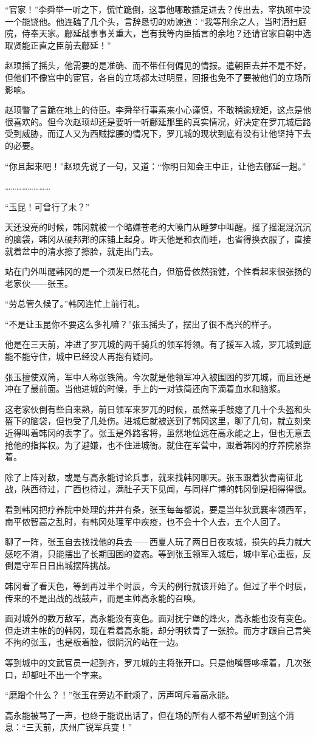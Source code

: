 “官家！”李舜举一听之下，慌忙跪倒，这事他哪敢插足进去？传出去，宰执班中没一个能饶他。他连磕了几个头，言辞恳切的劝谏道：“我等刑余之人，当时洒扫庭院，侍奉天家。鄜延战事事关重大，岂有我等内臣插言的余地？还请官家自朝中选取贤能正直之臣前去鄜延！”

赵顼摇了摇头，他需要的是准确、而不带任何偏见的情报。遣朝臣去并不是不好，但他们不像宫中的宦官，各自的立场都太过明显，回报也免不了要被他们的立场所影响。

赵顼瞥了言跪在地上的侍臣。李舜举行事素来小心谨慎，不敢稍逾规矩，这点是他很喜欢的。但今次赵顼却还是要听一听鄜延那里的真实情况，好决定在罗兀城后路受到威胁，而辽人又为西贼撑腰的情况下，罗兀城的现状到底有没有让他坚持下去的必要。

“你且起来吧！”赵顼先说了一句，又道：“你明日知会王中正，让他去鄜延一趟。”

……………………

“玉昆！可曾行了未？”

天还没亮的时候，韩冈就被一个略嫌苍老的大嗓门从睡梦中叫醒。摇了摇混混沉沉的脑袋，韩冈从硬邦邦的床铺上起身。昨天他是和衣而睡，也省得换衣服了，直接就着盆中的清水擦了擦脸，就走出门去。

站在门外叫醒韩冈的是一个须发已然花白，但筋骨依然强健，个性看起来很张扬的老家伙——张玉。

“劳总管久候了。”韩冈连忙上前行礼。

“不是让玉昆你不要这么多礼嘛？”张玉摇头了，摆出了很不高兴的样子。

他是在三天前，冲进了罗兀城的两千骑兵的领军将领。有了援军入城，罗兀城到底能不能守住，城中已经没人再抱有疑问。

张玉擅使双简，军中人称张铁简。今次就是他领军冲入被围困的罗兀城，而且还是冲在了最前面。当他进城的时候，手上的一对铁简还向下滴着血水和脑浆。

这老家伙倒有些自来熟，前日领军来罗兀的时候，虽然亲手敲瘪了几十个头盔和头盔下的脑袋，但也受了几处伤。进城后就被送到了韩冈这里，聊了几句，就立刻亲近得叫着韩冈的表字了。张玉是外路客将，虽然地位远在高永能之上，但也无意去抢他的指挥权。为了避嫌，也不住进城衙。就住在军营中，跟着韩冈的疗养院紧靠着。

除了上阵对敌，或是与高永能讨论兵事，就来找韩冈聊天。张玉跟着狄青南征北战，陕西待过，广西也待过，满肚子天下见闻，与同样广博的韩冈倒是相得得很。

看到韩冈把疗养院中处理的井井有条，张玉每每都说，要是当年狄武襄率领西军，南平侬智高之乱时，有韩冈处理军中疾疫，也不会十个人去，五个人回了。

聊了一阵，张玉自去找找他的兵去——西夏人玩了两日日夜攻城，损失的兵力就大感吃不消，只能摆出了长期围困的姿态。等到张玉领军入城后，城中军心重振，反倒是守军日日出城摆阵挑战。

韩冈看了看天色，等到再过半个时辰，今天的例行就该开始了。但过了半个时辰，传来的不是出战的战鼓声，而是主帅高永能的召唤。

面对城外的数万敌军，高永能没有变色。面对抚宁堡的烽火，高永能也没有变色。但走进主帐的的韩冈，现在看着高永能，却分明铁青了一张脸。而方才跟自己言笑不拘的张玉，也是板着脸，很阴沉的站在一边。

等到城中的文武官员一起到齐，罗兀城的主将张开口。只是他嘴唇哆嗦着，几次张口，却都吐不出一个字来。

“磨蹭个什么？！”张玉在旁边不耐烦了，厉声呵斥着高永能。

高永能被骂了一声，也终于能说出话了，但在场的所有人都不希望听到这个消息：“三天前，庆州广锐军兵变！”

